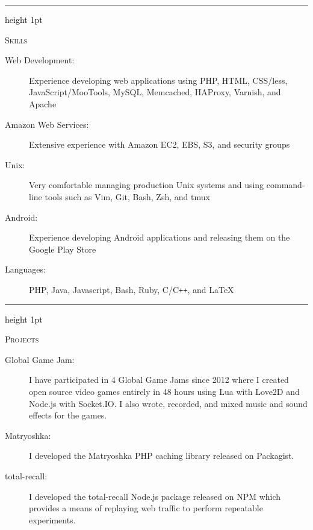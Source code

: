 \documentclass[letterpaper,10pt]{article}
\newcommand{\ressectiondivider}{
   \textcolor{black}{\hrule height 1pt}
}
\newenvironment{ressection}[1]{
   \vspace{12pt}
   \ressectiondivider
   \vspace{5pt}
   \begin{minipage}[t]{2.75cm}
      \flushleft
      \Large{\textrm{\textsc{#1}}}
   \end{minipage}
   \hfill
   \begin{minipage}[t]{16cm}
      \flushleft
}{
   \end{minipage}
}
\begin{document}
\begin{ressection}{Skills}
   \begin{description}
      \item[Web Development:]
      Experience developing web applications using PHP, HTML, CSS/less, JavaScript/MooTools, MySQL, Memcached, HAProxy, Varnish, and Apache
      \item[Amazon Web Services:]
      Extensive experience with Amazon EC2, EBS, S3, and security groups
      \item[Unix:]
      Very comfortable managing production Unix systems and using command-line tools such as Vim, Git, Bash, Zsh, and tmux
      \item[Android:]
      Experience developing Android applications and releasing them on the Google Play Store
      \item[Languages:]
      PHP, Java, Javascript, Bash, Ruby, C/C{}\verb!++!, and \LaTeX
   \end{description}
\end{ressection}

\begin{ressection}{Projects}
   \begin{description}
      \item[Global Game Jam:] I have participated in 4 Global Game Jams
         since 2012 where I created open source video games entirely in 48
         hours using Lua with Love2D and Node.js with Socket.IO. I also wrote,
         recorded, and mixed music and sound effects for the games.
      \item[Matryoshka:] I developed the Matryoshka PHP caching library released on Packagist.
      \item[total-recall:] I developed the total-recall Node.js package released on NPM which
         provides a means of replaying web traffic to perform repeatable experiments.
   \end{description}
\end{ressection}
\end{document}

